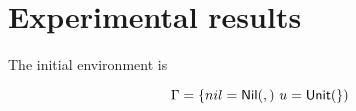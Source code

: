 \section{Experimental results}\label{sec:experimental}

\newcommand{\nil}{\constr{\cons{Nil}{}}}
\newcommand{\unit}{\constr{\cons{Unit}{}}}
\newcommand{\true}{\constr{\cons{True}{}}}
\newcommand{\false}{\constr{\cons{False}{}}}
\newcommand{\retTrue}{\matchreturn{\true}}
\newcommand{\retFalse}{\matchreturn{\false}}
\newcommand{\isShortBody}{\matchalt{\matchpat{(x : y : ys)}{\retFalse}}{\matchpat{ys}{\retTrue}}}
\newcommand{\isShortPMC}{\ensuremath{\isShort}}
\newcommand{\listu}{(u : nil)}
\newcommand{\singlePMC}{\abstr{(\matchpat{x}{\matchreturn{(x : nil)}})}}
\newcommand{\retSingle}{\matchreturn{(x : nil)}}
\newcommand{\matchNilList}{\matcharg{nil}{\matchpat{(y : ys)}{\retFalse}}}
\newcommand{\isShort}{\textit{isShort}}
\newcommand{\single}{\textit{single}}

The initial environment is

\[
    \Gamma = \{ nil = \nil,\ u = \unit \}
\]

